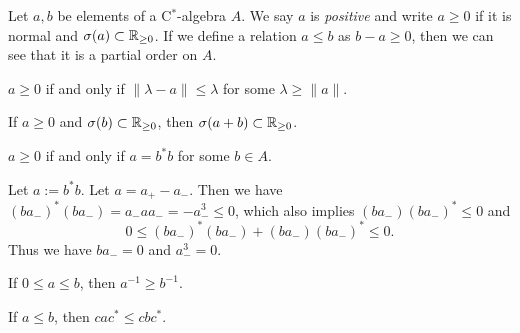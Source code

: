 \documentclass{../../large}
\begin{document}
\begin{prb}
Let $a,b$ be elements of a C$^*$-algebra $A$.
We say $a$ is \emph{positive} and write $a\ge0$ if it is normal and $\sigma(a)\subset\mathbb{R}_{\ge0}$.
If we define a relation $a\le b$ as $b-a\ge0$, then we can see that it is a partial order on $A$.
\begin{parts}
\item $a\ge0$ if and only if $\|\lambda-a\|\le\lambda$ for some $\lambda\ge\|a\|$.
\item If $a\ge0$ and $\sigma(b)\subset\mathbb{R}_{\ge0}$, then $\sigma(a+b)\subset\mathbb{R}_{\ge0}$.
\item $a\ge0$ if and only if $a=b^*b$ for some $b\in A$.
\end{parts}
\end{prb}
\begin{pf}


Let $a:=b^*b$.
Let $a=a_+-a_-$.
Then we have $(ba_-)^*(ba_-)=a_-aa_-=-a_-^3\le0$, which also implies $(ba_-)(ba_-)^*\le0$ and
\[0\le(ba_-)^*(ba_-)+(ba_-)(ba_-)^*\le0.\]
Thus we have $ba_-=0$ and $a_-^3=0$.

\end{pf}




\begin{prb}
\begin{parts}
\item If $0\le a\le b$, then $a^{-1}\ge b^{-1}$.
\item If $a\le b$, then $cac^*\le cbc^*$.
\end{parts}
\end{prb}
\end{document}
